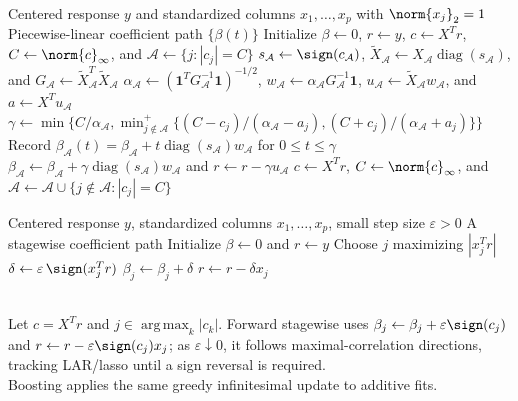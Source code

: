 \begin{breakablealgorithm}
\caption{Least Angle Regression Path}
\label{alg:sl-least-angle-regression-path}
\begin{algorithmic}
\Require Centered response $y$ and standardized columns $x_1,\ldots,x_p$ with $\norm{x_j}_2=1$
\Ensure Piecewise-linear coefficient path $\{\beta(t)\}$
\State Initialize $\beta\gets0$, $r\gets y$, $c\gets X^Tr$, $C\gets\norm{c}_\infty$, and $\mathcal{A}\gets\{j:|c_j|=C\}$
\Repeat
\State $s_{\mathcal{A}}\gets\sign(c_{\mathcal{A}})$, $\widetilde{X}_{\mathcal{A}}\gets X_{\mathcal{A}}\operatorname{diag}(s_{\mathcal{A}})$, and $G_{\mathcal{A}}\gets\widetilde{X}_{\mathcal{A}}^T\widetilde{X}_{\mathcal{A}}$
\State $\alpha_{\mathcal{A}}\gets(\mathbf{1}^TG_{\mathcal{A}}^{-1}\mathbf{1})^{-1/2}$, $w_{\mathcal{A}}\gets\alpha_{\mathcal{A}}G_{\mathcal{A}}^{-1}\mathbf{1}$, $u_{\mathcal{A}}\gets\widetilde{X}_{\mathcal{A}}w_{\mathcal{A}}$, and $a\gets X^Tu_{\mathcal{A}}$
\State $\gamma\gets\min\{C/\alpha_{\mathcal{A}},\min_{j\notin\mathcal{A}}^+\{(C-c_j)/(\alpha_{\mathcal{A}}-a_j),(C+c_j)/(\alpha_{\mathcal{A}}+a_j)\}\}$
\State Record $\beta_{\mathcal{A}}(t)=\beta_{\mathcal{A}}+t\operatorname{diag}(s_{\mathcal{A}})w_{\mathcal{A}}$ for $0\leq t\leq\gamma$
\State $\beta_{\mathcal{A}}\gets\beta_{\mathcal{A}}+\gamma\operatorname{diag}(s_{\mathcal{A}})w_{\mathcal{A}}$ and $r\gets r-\gamma u_{\mathcal{A}}$
\State $c\gets X^Tr$, $C\gets\norm{c}_\infty$, and $\mathcal{A}\gets\mathcal{A}\cup\{j\notin\mathcal{A}:|c_j|=C\}$
\end{algorithmic}
\end{breakablealgorithm}

\begin{breakablealgorithm}
\caption{Incremental Forward Stagewise Regression}
\label{alg:sl-incremental-forward-stagewise-regression}
\begin{algorithmic}
\Require Centered response $y$, standardized columns $x_1,\ldots,x_p$, small step size $\varepsilon>0$
\Ensure A stagewise coefficient path
\State Initialize $\beta\gets0$ and $r\gets y$
\Repeat
\State Choose $j$ maximizing $|x_j^Tr|$
\State $\delta\gets\varepsilon\,\sign(x_j^Tr)$
\State $\beta_j\gets\beta_j+\delta$
\State $r\gets r-\delta x_j$
\end{algorithmic}
\end{breakablealgorithm}

\begin{remark} \label{rem:sl-lar-stagewise-comparison} \\
Let $c=X^Tr$ and $j\in\operatorname*{arg\,max}_k |c_k|$. Forward stagewise uses $\beta_j\gets\beta_j+\varepsilon\sign(c_j)$ and $r\gets r-\varepsilon\sign(c_j)x_j$; as $\varepsilon\downarrow0$, it follows maximal-correlation directions, tracking LAR/lasso until a sign reversal is required.\\
Boosting applies the same greedy infinitesimal update to additive fits.
\end{remark}

